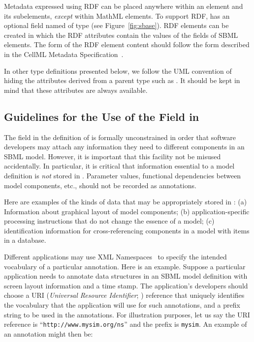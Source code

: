 \documentclass[10pt,twocolumntoc]{cekarticle}
\newcommand{\vref}[1]{\ref{#1}}
\begin{document}
Metadata expressed using RDF can be placed anywhere within an 
element and its subelements, \emph{except} within MathML elements.  To
support RDF,  has an optional field named  of
type  (see Figure~\vref{fig:sbase}).  RDF 
elements can be created in which the RDF  attributes
contain the values of the  fields of SBML elements.  The
form of the RDF element content should follow the form described in the
CellML Metadata Specification~\citep{cuellar:2002}.

In other type definitions presented below, we follow the UML convention of
hiding the attributes derived from a parent type such as . It
should be kept in mind that these attributes are always available.


\subsection{Guidelines for the Use of the  Field in
  }

The  field in the definition of  is
formally unconstrained in order that software developers may attach any
information they need to different components in an SBML model. However,
it is important that this facility not be misused accidentally.  In
particular, it is critical that information essential to a model definition
is \emph{not} stored in .  Parameter values, functional
dependencies between model components, etc., should not be recorded as
annotations.

Here are examples of the kinds of data that may be appropriately
stored in : (a) Information about graphical
layout of model components; (b) application-specific processing
instructions that do not change the essence of a model; (c)
identification information for cross-referencing components in a
model with items in a database.

Different applications may use XML Namespaces~\citep{bray:1999} to specify
the intended vocabulary of a particular annotation.  Here is an example.
Suppose a particular application needs to annotate data structures in
an SBML model definition with screen layout information and a time stamp.
The application's developers should choose a URI (\emph{Universal Resource
  Identifier}; \citealt{harold:2001,w3c:2000}) reference that uniquely
identifies the vocabulary that the application will use for such
annotations, and a prefix string to be used in the annotations.  For
illustration purposes, let us say the URI reference is
``\texttt{http://www.mysim.org/ns}'' and the prefix is \texttt{mysim}.  An
example of an annotation might then be:
\end{document}
